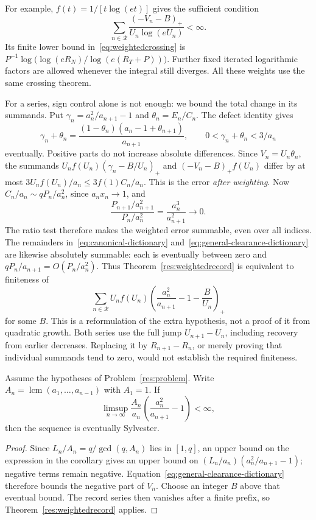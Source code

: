 \documentclass[11pt]{article}
\begin{document}
For example, $f(t)=1/[t\log(et)]$ gives the sufficient condition
\[
 \sum_{n\in\mathcal R}\frac{(-V_n-B)_+}{U_n\log(eU_n)}<\infty.
\]
Its finite lower bound in~\eqref{eq:weightedcrossing} is
$P^{-1}\log\bigl(\log(eR_N)/\log(e(R_T+P))\bigr)$.
Further fixed iterated logarithmic factors are allowed whenever the integral
still diverges. All these weights use the same crossing theorem.

For a series, sign control alone is not enough: we bound the total
change in its summands. Put $\gamma_n=a_n^2/a_{n+1}-1$ and
$\theta_n=E_n/C_n$. The defect identity gives
\[
 \gamma_n+\theta_n=
 \frac{(1-\theta_n)(a_n-1+\theta_{n+1})}{a_{n+1}},
 \qquad 0<\gamma_n+\theta_n<3/a_n
\]
eventually. Positive parts do not increase absolute differences.
Since $V_n=U_n\theta_n$, the summands
$U_nf(U_n)(\gamma_n-B/U_n)_+$ and $(-V_n-B)_+f(U_n)$ differ by at most
$3U_nf(U_n)/a_n\le3f(1)C_n/a_n$. This is the error \emph{after weighting}.
Now $C_n/a_n\sim qP_n/a_n^2$, since $a_nx_n\to1$, and
\[
 \frac{P_{n+1}/a_{n+1}^{2}}{P_n/a_n^{2}}
 =\frac{a_n^3}{a_{n+1}^{2}}\longrightarrow0.
\]
The ratio test therefore makes the weighted error summable, even over
all indices. The remainders in~\eqref{eq:canonical-dictionary}
and~\eqref{eq:general-clearance-dictionary} are likewise absolutely
summable: each is eventually between zero and
$qP_n/a_{n+1}=O(P_n/a_n^2)$.
Thus Theorem~\ref{res:weightedrecord} is equivalent to finiteness of
\begin{equation}\label{eq:weightedgrowth}
 \sum_{n\in\mathcal R}U_nf(U_n)
 \left(\frac{a_n^2}{a_{n+1}}-1-\frac B{U_n}\right)_+
\end{equation}
for some $B$. This is a reformulation of the extra hypothesis, not a
proof of it from quadratic growth. Both series use the full jump
$U_{n+1}-U_n$, including recovery from earlier decreases. Replacing it
by $R_{n+1}-R_n$, or merely proving that individual summands tend to
zero, would not establish the required finiteness.

\begin{corollary}\label{res:lcmbounded}
Assume the hypotheses of Problem~\ref{res:problem}. Write
$A_n=\operatorname{lcm}(a_1,\ldots,a_{n-1})$ with $A_1=1$. If
\[
 \limsup_{n\to\infty}\frac{A_n}{a_n}
 \left(\frac{a_n^2}{a_{n+1}}-1\right)<\infty,
\]
then the sequence is eventually Sylvester.
\end{corollary}

\begin{proof}
Since $L_n/A_n=q/\gcd(q,A_n)$ lies in $[1,q]$, an upper bound on the
expression in the corollary gives an upper bound on
$(L_n/a_n)(a_n^2/a_{n+1}-1)$; negative terms remain negative.
Equation~\eqref{eq:general-clearance-dictionary} therefore bounds the
negative part of $V_n$. Choose an integer $B$ above
that eventual bound. The record series then vanishes after a finite prefix,
so Theorem~\ref{res:weightedrecord} applies.
\end{proof}
\end{document}
